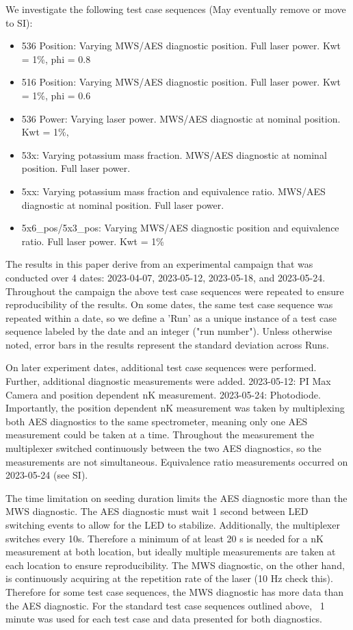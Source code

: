 We investigate the following test case sequences (May eventually remove or move to SI):
\begin{itemize}
    \item 536 Position: Varying MWS/AES diagnostic position. Full laser power. Kwt = 1\%, phi = 0.8
    \item 516 Position: Varying MWS/AES diagnostic position. Full laser power. Kwt = 1\%, phi = 0.6
    \item 536 Power: Varying laser power. MWS/AES diagnostic at nominal position. Kwt = 1\%, 
    \item 53x: Varying potassium mass fraction. MWS/AES diagnostic at nominal position. Full laser power.
    \item 5xx: Varying potassium mass fraction and equivalence ratio. MWS/AES diagnostic at nominal position. Full laser power.
    \item 5x6\_pos/5x3\_pos: Varying MWS/AES diagnostic position and equivalence ratio. Full laser power. Kwt = 1\%
\end{itemize}

The results in this paper derive from an experimental campaign that was conducted over 4 dates: 2023-04-07, 2023-05-12, 2023-05-18, and 2023-05-24. Throughout the campaign the above test case sequences were repeated to ensure reproducibility of the results. On some dates, the same test case sequence was repeated within a date, so we define a 'Run' as a unique instance of a test case sequence labeled by the date and an integer ("run number").  Unless otherwise noted, error bars in the results represent the standard deviation across Runs. 

On later experiment dates, additional test case sequences were performed. Further, additional diagnostic measurements were added. 2023-05-12: PI Max Camera and position dependent nK measurement. 2023-05-24: Photodiode. Importantly, the position dependent nK measurement was taken by multiplexing both AES diagnostics to the same spectrometer, meaning only one AES measurement could be taken at a time. Throughout the measurement the multiplexer switched continuously between the two AES diagnostics, so the measurements are not simultaneous. Equivalence ratio measurements occurred on 2023-05-24 (see SI). 

The time limitation on seeding duration limits the AES diagnostic more than the MWS diagnostic. The AES diagnostic must wait 1 second between LED switching events to allow for the LED to stabilize. Additionally, the multiplexer switches every 10s. Therefore a minimum of at least 20 s is needed for a nK measurement at both location, but ideally multiple measurements are taken at each location to ensure reproducibility. The MWS diagnostic, on the other hand, is continuously acquiring at the repetition rate of the laser (10 Hz check this). Therefore for some test case sequences, the MWS diagnostic has more data than the AES diagnostic. For the standard test case sequences outlined above, ~1 minute was used for each test case and data presented for both diagnostics.  

